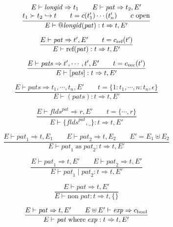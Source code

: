 \documentclass[twoside]{article}
\newcommand{\conarrow}{\hookrightarrow}
\newcommand{\x}[1]{\mathit{#1}}
\newcommand{\f}[1]{\mbox{#1}}
\renewcommand{\c}[1]{c_{\f{\scriptsize #1}}}
\newcommand{\longid}{\x{longid}}
\renewcommand{\exp}{\x{exp}}
\newcommand{\flds}{\x{flds}}
\newcommand{\pat}{\x{pat}}
\newcommand{\pats}{\x{pats}}
\begin{document}
\begin{equation}
\frac{
\begin{array}{@{}c@{}}
E \vdash \longid \Rightarrow t_1
\qquad
E \vdash \pat \Rightarrow t_2,E'
\\
t_1 \succ t_2 \conarrow t
\qquad
t = c(t_1')\cdots(t_n')
\qquad
\mbox{$c$ open}
\end{array}
}{
E \vdash @\longid(\pat) : t \Rightarrow t,E'
}
\end{equation}

\begin{equation}
\frac{
E \vdash \pat \Rightarrow t',E'
\qquad
t = \c{ref}(t')
}{
E \vdash \f{ref}(\pat) : t \Rightarrow t,E'
}
\end{equation}

\begin{equation}
\frac{
E \vdash \pats \Rightarrow t',\cdots,t',E'
\qquad
t = \c{vec}(t')
}{
E \vdash [\pats] : t \Rightarrow t,E'
}
\end{equation}

\begin{equation}
\frac{
E \vdash \pats \Rightarrow t_1,\cdots,t_n,E'
\qquad
t = \{1:t_1,\cdots,n:t_n,\epsilon\}
}{
E \vdash (\pats) : t \Rightarrow t,E'
}
\end{equation}

\begin{equation}
\frac{
E \vdash \flds^\pat \Rightarrow r,E'
\qquad
t = \{\cdots,r\}
}{
E \vdash \{\flds^\pat,\_\} : t \Rightarrow t,E'
}
\end{equation}

\begin{equation}
\frac{
E \vdash \pat_1 \Rightarrow t,E_1
\qquad
E \vdash \pat_2 \Rightarrow t,E_2
\qquad
E' = E_1 \uplus E_2
}{
E \vdash \pat_1\;\f{as}\;\pat_2 : t \Rightarrow t,E'
}
\end{equation}

\begin{equation}
\frac{
E \vdash \pat_1 \Rightarrow t,E'
\qquad
E \vdash \pat_2 \Rightarrow t,E'
}{
E \vdash \pat_1\;|\;\pat_2 : t \Rightarrow t,E'
}
\end{equation}

\begin{equation}
\frac{
E \vdash \pat \Rightarrow t,E'
}{
E \vdash \f{non}\;\pat : t \Rightarrow t,\{\}
}
\end{equation}

\begin{equation}
\frac{
E \vdash \pat \Rightarrow t,E'
\qquad
E \uplus E' \vdash \exp \Rightarrow \c{bool}
}{
E \vdash \pat\;\f{where}\;\exp : t \Rightarrow t,E'
}
\end{equation}
\end{document}
